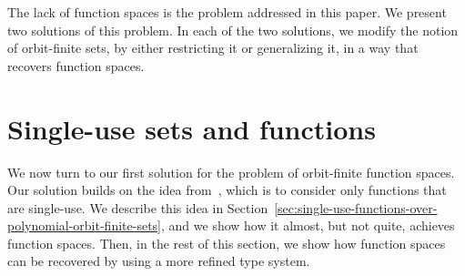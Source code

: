 
 

The lack of function spaces is the problem  addressed in this paper. We present two solutions of this problem. In each of the two solutions, we modify the notion of orbit-finite sets, by either restricting it or generalizing it, in a way that recovers function spaces. 




\section{Single-use sets and functions}
\label{sec:single-use-sets}
We now turn to our first solution for the problem of orbit-finite function spaces.  Our solution builds on the idea from~\cite[Section 2.2]{stefanski-phd}, which is to consider only functions that are single-use. We describe this idea in Section~\ref{sec:single-use-functions-over-polynomial-orbit-finite-sets}, and we show how it almost, but not quite, achieves function spaces. Then, in the rest of this section, we show how function spaces can be recovered by using a more refined type system. 


